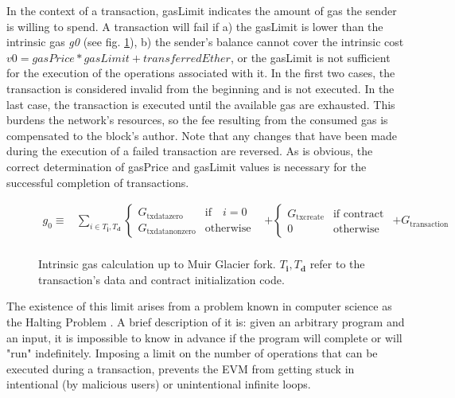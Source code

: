 In the context of a transaction, gasLimit indicates the amount of gas the sender is willing to spend. A transaction will fail if a) the gasLimit is lower than the intrinsic gas \textit{g0} (see fig. \ref{fig:intrinsic_cost}), b) the sender's balance cannot cover the intrinsic cost \(v0 = gasPrice * gasLimit + transferredEther\), or the gasLimit is not sufficient for the execution of the operations associated with it. In the first two cases, the transaction is considered invalid from the beginning and is not executed. In the last case, the transaction is executed until the available gas are exhausted. This burdens the network's resources, so the fee resulting from the consumed gas is compensated to the block's author. Note that any changes that have been made during the execution of a failed transaction are reversed. As is obvious, the correct determination of gasPrice and gasLimit values is necessary for the successful completion of transactions.

\begin{figure}[h!]
\begin{small}
\setlength{\mathindent}{0pt}
\begin{align}
g_0 \equiv {} & \sum_{i \in T_{\mathbf{i}}, T_{\mathbf{d}}} \begin{cases} {G_{\mathrm{txdatazero}}} & \text{if} \quad i = 0 \\ {G_{\mathrm{txdatanonzero}}} & \text{otherwise} \end{cases}
\nonumber {} & + \begin{cases} {G_{\mathrm{txcreate}}} & \text{if contract creation} \\ 0 & \text{otherwise} \end{cases}
\nonumber {} & + {G_{\mathrm{transaction}}} \\
\nonumber
\end{align}
\end{small}
\caption{Intrinsic gas calculation up to Muir Glacier fork. $T_{\mathbf{i}},T_{\mathbf{d}}$ refer to the transaction's data and contract initialization code.}
\label{fig:intrinsic_cost}
\end{figure}

The existence of this limit arises from a problem known in computer science as the Halting Problem \citep{burkholder_1987}. A brief description of it is: given an arbitrary program and an input, it is impossible to know in advance if the program will complete or will "run" indefinitely. Imposing a limit on the number of operations that can be executed during a transaction, prevents the EVM from getting stuck in intentional (by malicious users) or unintentional infinite loops.

